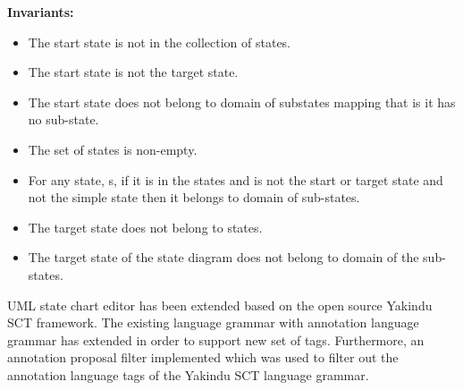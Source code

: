 \textbf{Invariants:}
\begin{itemize}
\item The start state is not in the collection of states.
\item The start state is not the target state.
\item The start state does not belong to domain of substates
mapping that is it has no sub-state.
\item The set of states is non-empty.
\item For any state, s, if it is in the states and is not the start or target state and not the simple state then it belongs to domain of sub-states.
\item The target state does not belong to states.
\item The target state of the state diagram does not belong to domain of the sub-states.
\end{itemize}

UML state chart editor has been extended based on the open source Yakindu SCT \cite{ref_15_yakindu:sct}framework. The existing language grammar with
annotation language grammar has extended in order to support new set
of tags. Furthermore, an annotation proposal filter implemented which was used to filter out the annotation language tags of the Yakindu SCT language grammar.\\

